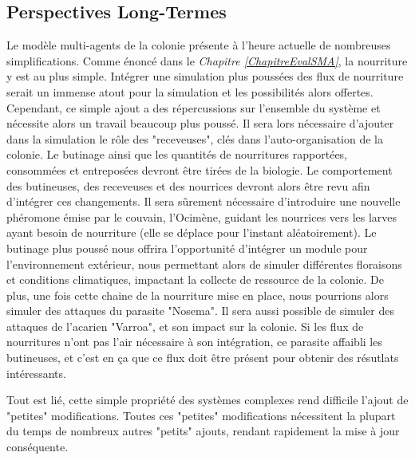 	\subsection{Perspectives Long-Termes}
	Le modèle multi-agents de la colonie présente à l'heure actuelle de nombreuses simplifications. Comme énoncé dans le \textit{Chapitre \ref{ChapitreEvalSMA}}, la nourriture y est au plus simple. Intégrer une simulation plus poussées des flux de nourriture serait un immense atout pour la simulation et les possibilités alors offertes. Cependant, ce simple ajout a des répercussions sur l'ensemble du système et nécessite alors un travail beaucoup plus poussé. Il sera lors nécessaire d'ajouter dans la simulation le rôle des "receveuses", clés dans l'auto-organisation de la colonie. Le butinage ainsi que les quantités de nourritures rapportées, consommées et entreposées devront être tirées de la biologie. Le comportement des butineuses, des receveuses et des nourrices devront alors être revu afin d'intégrer ces changements. Il sera sûrement nécessaire d'introduire une nouvelle phéromone émise par le couvain, l'Ocimène, guidant les nourrices vers les larves ayant besoin de nourriture (elle se déplace pour l'instant aléatoirement). Le butinage plus poussé nous offrira l'opportunité d'intégrer un module pour l'environnement extérieur, nous permettant alors de simuler différentes floraisons et conditions climatiques, impactant la collecte de ressource de la colonie. De plus, une fois cette chaine de la nourriture mise en place, nous pourrions alors simuler des attaques du parasite "Nosema". Il sera aussi possible de simuler des attaques de l'acarien "Varroa", et son impact sur la colonie. Si les flux de nourritures n'ont pas l'air nécessaire à son intégration, ce parasite affaibli les butineuses, et c'est en ça que ce flux doit être présent pour obtenir des résutlats intéressants.
	
	Tout est lié, cette simple propriété des systèmes complexes rend difficile l'ajout de "petites" modifications. Toutes ces "petites" modifications nécessitent la plupart du temps de nombreux autres "petits" ajouts, rendant rapidement la mise à jour conséquente.
	